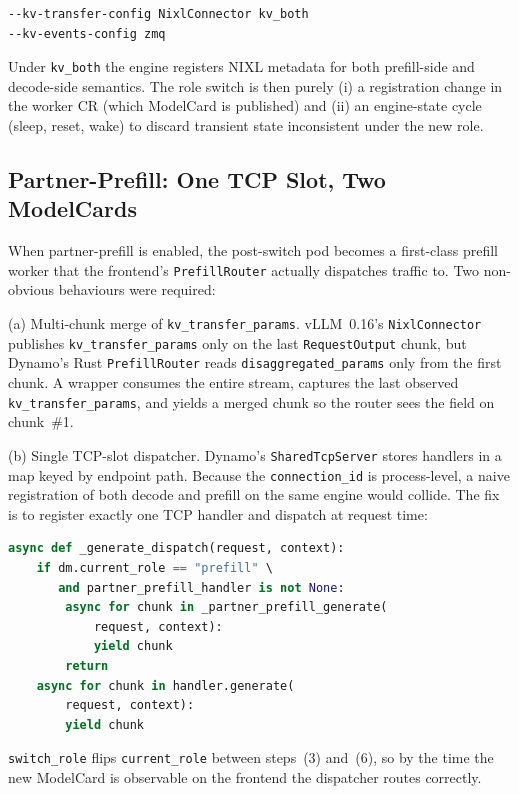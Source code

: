 \documentclass[10pt,twocolumn,letterpaper]{article}
\begin{document}
\begin{lstlisting}
--kv-transfer-config NixlConnector kv_both
--kv-events-config zmq
\end{lstlisting}

Under \texttt{kv\_both} the engine registers NIXL metadata for both prefill-side and decode-side semantics. The role switch is then purely (i) a registration change in the worker CR (which ModelCard is published) and (ii) an engine-state cycle (sleep, reset, wake) to discard transient state inconsistent under the new role.

\subsection{Partner-Prefill: One TCP Slot, Two ModelCards}
\label{sec:partner-prefill}

When partner-prefill is enabled, the post-switch pod becomes a first-class prefill worker that the frontend's \texttt{PrefillRouter} actually dispatches traffic to. Two non-obvious behaviours were required:

(a) Multi-chunk merge of \texttt{kv\_transfer\_params}. vLLM~0.16's \texttt{NixlConnector} publishes \texttt{kv\_transfer\_params} only on the last \texttt{RequestOutput} chunk, but Dynamo's Rust \texttt{PrefillRouter} reads \texttt{disaggregated\_params} only from the first chunk. A wrapper consumes the entire stream, captures the last observed \texttt{kv\_transfer\_params}, and yields a merged chunk so the router sees the field on chunk~\#1.

(b) Single TCP-slot dispatcher. Dynamo's \texttt{SharedTcpServer} stores handlers in a map keyed by endpoint path. Because the \texttt{connection\_id} is process-level, a naive registration of both decode and prefill on the same engine would collide. The fix is to register exactly one TCP handler and dispatch at request time:

\begin{lstlisting}[language=Python]
async def _generate_dispatch(request, context):
    if dm.current_role == "prefill" \
       and partner_prefill_handler is not None:
        async for chunk in _partner_prefill_generate(
            request, context):
            yield chunk
        return
    async for chunk in handler.generate(
        request, context):
        yield chunk
\end{lstlisting}

\texttt{switch\_role} flips \texttt{current\_role} between steps~(3) and~(6), so by the time the new ModelCard is observable on the frontend the dispatcher routes correctly.
\end{document}
